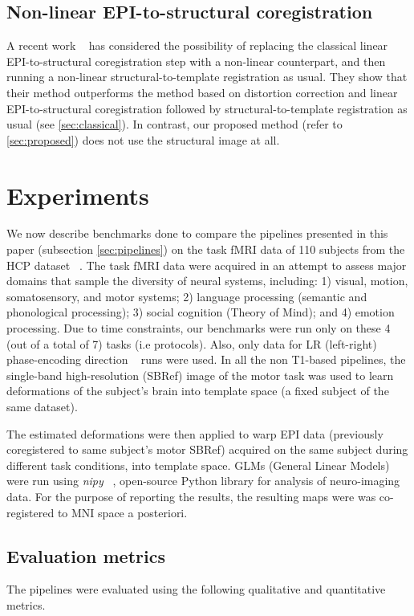 \subsection{Non-linear EPI-to-structural coregistration}
A recent work ~\citep{wang2017} has considered the possibility of replacing the classical
linear EPI-to-structural coregistration step with a non-linear counterpart,
and then running a non-linear structural-to-template registration as usual.
They show that their method outperforms the method based on distortion correction
and linear EPI-to-structural coregistration followed by structural-to-template
registration as usual (see \ref{sec:classical}). In contrast, our proposed
method (refer to \ref{sec:proposed}) does not use the structural image at all.


\section{Experiments}
\label{sec:exp_epi2epi}
We now describe benchmarks done to compare the pipelines presented in
this paper (subsection \ref{sec:pipelines}) on the task fMRI data of
110 subjects from the HCP dataset ~\citep{VanEssen20122222}. 
The task fMRI data were acquired in an attempt to assess major domains
that
sample the diversity of neural systems, including: 1) visual, motion,
somatosensory, and motor systems; 2) language processing (semantic and
phonological processing); 3) social cognition (Theory of Mind); and 4)
emotion processing.
Due to time constraints, our benchmarks were run only on these 4 (out
of a total of 7) tasks (i.e protocols). Also, only data for LR (left-right)
phase-encoding direction ~\citep{chang1992technique} runs were used. In all the non T1-based
pipelines, the single-band high-resolution (SBRef) image of the motor
task was used to learn deformations of the subject's brain into
template space (a fixed subject of the same dataset).

The estimated
deformations were then applied to warp EPI data (previously
coregistered to same subject's motor SBRef) acquired on the same
subject during different task conditions, into template space.
GLMs (General Linear Models) ~\citep{friston1994statistical} were run
using \textit{nipy} ~\citep{Gorgolewski2011}, open-source Python library for analysis of neuro-imaging data. For the purpose of reporting the results, the resulting maps were was co-registered to
MNI space a posteriori.

\subsection{Evaluation metrics}
The pipelines were evaluated using the following qualitative and quantitative
metrics.

